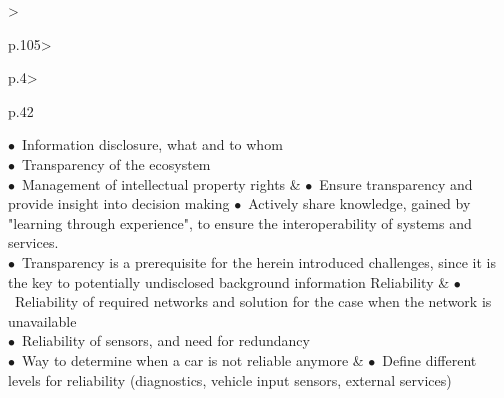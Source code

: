 \begin{table}[t]
\begin{small}
\begin{supertabular}{%
		>{\raggedright}p{.105\textwidth}>{\raggedright}p{.4\textwidth}>{\raggedright}p{.42\textwidth}}
				\noindent $\bullet$~Information disclosure, what and to whom\\
				\noindent $\bullet$~Transparency of the ecosystem\\
				\noindent $\bullet$~Management of intellectual property rights
			& \vspace{.1cm}
				\noindent $\bullet$~Ensure transparency and provide insight into decision making
				\noindent $\bullet$~Actively share knowledge, gained by "learning through experience", to ensure the interoperability of systems and services.\\
				\noindent $\bullet$~Transparency is a prerequisite for the herein introduced challenges, since it is the key to potentially undisclosed background information \vspace{.2cm} %
 			 \tabularnewline \hline %
			\vspace{.1cm}Reliability & \vspace{.1cm}
				\noindent $\bullet$~Reliability of required networks and solution for the case when the network is unavailable\\
				\noindent $\bullet$~Reliability of sensors, and need for redundancy\\
				\noindent $\bullet$~Way to determine when a car is not reliable anymore \vspace{.2cm}%
			& \vspace{.1cm}
				\noindent $\bullet$~Define different levels for reliability (diagnostics, vehicle input sensors, external services)\\

\end{supertabular}
\end{small}
\end{table}
